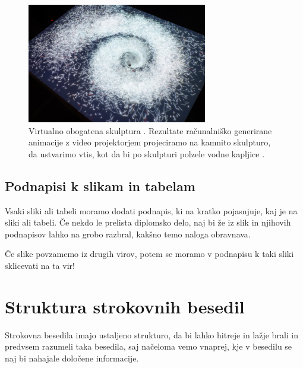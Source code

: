 \documentclass[a4paper,12pt,openright]{book}
\begin{document}
    \begin{figure}[htb]
        \begin{center}
            \includegraphics[width=0.7\textwidth]{galaksija}
        \end{center}
        \caption{Virtualno obogatena skulptura \cite{vodnjak}. Rezultate računalniško generirane animacije z video projektorjem projeciramo na kamnito skulpturo, da ustvarimo vtis, kot da bi po skulpturi polzele vodne kapljice \cite{video,solina2020skulpture}.}
        \label{pic1}
    \end{figure}


    \section{Podnapisi k slikam in tabelam}

    Vsaki sliki ali tabeli moramo dodati podnapis, ki na kratko pojasnjuje, kaj je na sliki ali tabeli.
    Če nekdo le prelista diplomsko delo, naj bi že iz slik in njihovih podnapisov lahko na grobo razbral, kakšno temo naloga obravnava.

    Če slike povzamemo iz drugih virov, potem se moramo v podnapisu k taki sliki sklicevati na ta vir!


    \chapter{Struktura strokovnih besedil}
    \label{stroka}

    Strokovna besedila imajo ustaljeno strukturo, da bi lahko hitreje in lažje brali in predvsem razumeli taka besedila, saj načeloma vemo vnaprej,
    kje v besedilu se naj bi nahajale določene informacije.
\end{document}
